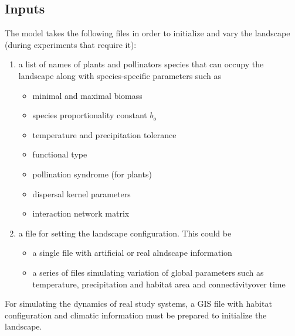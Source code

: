 \documentclass[11pt, a4paper]{article}
\begin{document}
\subsection{Inputs}
The model takes the following files in order to initialize and vary the landscape (during experiments that require it): %
\begin{enumerate}
 \item a list of names of plants and pollinators species that can occupy the landscape along with species-specific parameters such as
 \par\begin{itemize}
 \par \item minimal and maximal biomass
 \par \item specie\textquotesingle s proportionality constant $b_o$ \cite{MTE} %
 \par \item temperature and precipitation tolerance
 \par \item functional type
 \par \item pollination syndrome (for plants)
 \par \item dispersal kernel parameters
 \par \item interaction network matrix %
 \par\end{itemize}
 \item  a file for setting the landscape configuration. This could be
 \par \begin{itemize}
 \par \item a single file with artificial or real alndscape information
 \par \item a series of files simulating variation of global parameters such as temperature,  precipitation and habitat area and connectivityover time
 \par \end{itemize}
\end{enumerate}
For simulating the dynamics of real study systems, a GIS file with habitat configuration and climatic information must be prepared to initialize the landscape.
\end{document}
